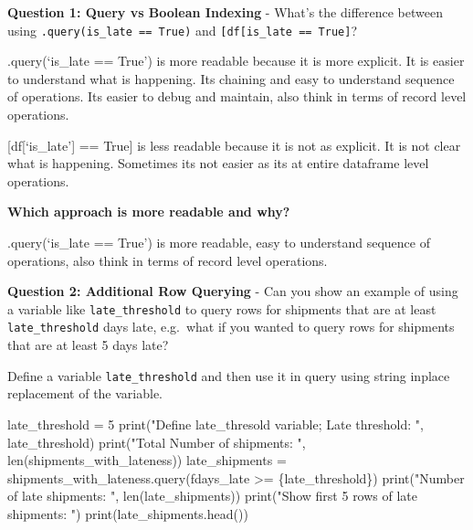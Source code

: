 \documentclass[
]{article}
\newenvironment{Shaded}{\begin{snugshade}}{\end{snugshade}}
\newcommand{\BuiltInTok}[1]{\textcolor[rgb]{0.00,0.23,0.31}{#1}}
\newcommand{\DecValTok}[1]{\textcolor[rgb]{0.68,0.00,0.00}{#1}}
\newcommand{\NormalTok}[1]{\textcolor[rgb]{0.00,0.23,0.31}{#1}}
\newcommand{\OperatorTok}[1]{\textcolor[rgb]{0.37,0.37,0.37}{#1}}
\newcommand{\SpecialCharTok}[1]{\textcolor[rgb]{0.37,0.37,0.37}{#1}}
\newcommand{\SpecialStringTok}[1]{\textcolor[rgb]{0.13,0.47,0.30}{#1}}
\newcommand{\StringTok}[1]{\textcolor[rgb]{0.13,0.47,0.30}{#1}}
\begin{document}
\textbf{Question 1: Query vs Boolean Indexing} - What's the difference
between using
\texttt{.query(\textquotesingle{}is\_late\ ==\ True\textquotesingle{})}
and
\texttt{{[}df{[}\textquotesingle{}is\_late\textquotesingle{}{]}\ ==\ True{]}}?

.query(`is\_late == True') is more readable because it is more explicit.
It is easier to understand what is happening. Its chaining and easy to
understand sequence of operations. Its easier to debug and maintain,
also think in terms of record level operations.

{[}df{[}`is\_late'{]} == True{]} is less readable because it is not as
explicit. It is not clear what is happening. Sometimes its not easier as
its at entire dataframe level operations.

\textbf{Which approach is more readable and why?}

.query(`is\_late == True') is more readable, easy to understand sequence
of operations, also think in terms of record level operations.

\textbf{Question 2: Additional Row Querying} - Can you show an example
of using a variable like \texttt{late\_threshold} to query rows for
shipments that are at least \texttt{late\_threshold} days late,
e.g.~what if you wanted to query rows for shipments that are at least 5
days late?

Define a variable \texttt{late\_threshold} and then use it in query
using string inplace replacement of the variable.

\label{additional-row-querying}
\begin{Shaded}
\begin{Highlighting}[]
\NormalTok{late\_threshold }\OperatorTok{=} \DecValTok{5}
\BuiltInTok{print}\NormalTok{(}\StringTok{"Define late\_thresold variable; Late threshold: "}\NormalTok{, late\_threshold)}
\BuiltInTok{print}\NormalTok{(}\StringTok{"Total Number of shipments: "}\NormalTok{, }\BuiltInTok{len}\NormalTok{(shipments\_with\_lateness))}
\NormalTok{late\_shipments }\OperatorTok{=}\NormalTok{ shipments\_with\_lateness.query(}\SpecialStringTok{f\textquotesingle{}days\_late \textgreater{}= }\SpecialCharTok{\{}\NormalTok{late\_threshold}\SpecialCharTok{\}}\SpecialStringTok{\textquotesingle{}}\NormalTok{)}
\BuiltInTok{print}\NormalTok{(}\StringTok{"Number of late shipments: "}\NormalTok{, }\BuiltInTok{len}\NormalTok{(late\_shipments))}
\BuiltInTok{print}\NormalTok{(}\StringTok{"Show first 5 rows of late shipments: "}\NormalTok{)}
\BuiltInTok{print}\NormalTok{(late\_shipments.head())}
\end{Highlighting}
\end{Shaded}
\end{document}
